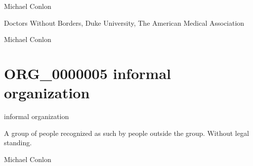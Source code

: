 \documentclass[letterpaper,10pt,english]{sphinxmanual}
\begin{document}
\begin{sphinxShadowBox}

\sphinxAtStartPar
Michael Conlon 
\end{sphinxShadowBox}

\begin{sphinxShadowBox}

\sphinxAtStartPar
Doctors Without Borders, Duke University, The American Medical Association
\end{sphinxShadowBox}

\begin{sphinxShadowBox}

\sphinxAtStartPar
Michael Conlon 
\end{sphinxShadowBox}
\begin{quote}
\label{\detokenize{doc-ORG_0000005:org-0000005}}\label{\detokenize{doc-ORG_0000005:informal-organization}}\label{\detokenize{doc-ORG_0000005:org-0000005}}
\ignorespaces \end{quote}


\section{ORG\_0000005 \sphinxhyphen{} informal organization}
\label{\detokenize{doc-ORG_0000005:org-0000005-informal-organization}}\label{\detokenize{doc-ORG_0000005:index-0}}\label{\detokenize{doc-ORG_0000005::doc}}
\begin{sphinxShadowBox}

\sphinxAtStartPar
informal organization
\end{sphinxShadowBox}

\begin{sphinxShadowBox}

\sphinxAtStartPar
A group of people recognized as such by people outside the group. Without legal standing.
\end{sphinxShadowBox}

\begin{sphinxShadowBox}

\sphinxAtStartPar
Michael Conlon 
\end{sphinxShadowBox}
\end{document}
